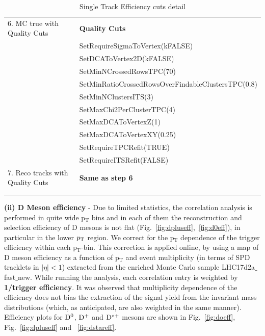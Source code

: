 \begin{table}[h]
\begin{tabular}{  p{5cm} |  p{8.5cm} }
6. MC true with Quality Cuts         &      			      {\textbf  {Quality Cuts }} \\
																	&SetRequireSigmaToVertex(kFALSE) \\
																	&SetDCAToVertex2D(kFALSE) \\
																	&SetMinNCrossedRowsTPC(70)\\
																	&SetMinRatioCrossedRowsOverFindableClustersTPC(0.8)\\
																	&SetMinNClustersITS(3)\\
																	&SetMaxChi2PerClusterTPC(4)\\
																	&SetMaxDCAToVertexZ(1) \\
																	&SetMaxDCAToVertexXY(0.25) \\
																	&SetRequireTPCRefit(TRUE) \\
																	&SetRequireITSRefit(FALSE) \\

7. Reco tracks with Quality Cuts         &             {\textbf  {Same as step 6}} \\

 &\\		            	            		

 \hline \hline
 \\
\end{tabular}
\caption{\large {Single Track Efficiency cuts detail}} %
\label{table:effCuts}	
\end{table}


{\bf \large (ii) D Meson efficiency} - Due to limited statistics, the correlation analysis is performed in quite wide p$_\mathrm{T}$ bins and in each of them the reconstruction and selection efficiency of D mesons is not flat (Fig.~\ref{fig:dpluseff},~\ref{fig:d0eff}), in particular in the lower $p_{\rm T}$ region. We correct for the p$_\mathrm{T}$ dependence of the trigger efficiency within each p$_\mathrm{T}$-bin.
This correction is applied online, by using a map of D meson efficiency as a function of p$_\mathrm{T}$ and event multiplicity (in terms of SPD tracklets in $|\eta|<1$) extracted from the enriched Monte Carlo sample LHC17d2a$\_$fast$\_$new.
While running the analysis, each correlation entry is weighted by {\bf 1/trigger efficiency}. It was observed that multiplicity dependence of the efficiency does not bias the extraction of the signal yield from the invariant mass distributions (which, as anticipated, are also weighted in the same manner). Efficiency plots for ${\rm D^0}$, ${\rm D^+}$ and ${\rm D^{*+}}$ mesons are shown in Fig.~\ref{fig:doeff}, Fig.~\ref{fig:dpluseff} and ~\ref{fig:dstareff}.

